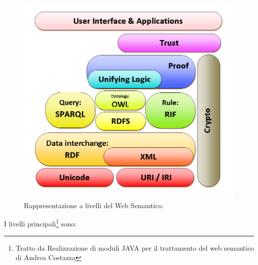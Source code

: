 \documentclass[a4paper,11pt]{article}
\begin{document}
\begin{figure}[ht]
	\centering
	\includegraphics[scale=0.5]{semweb-layers.png}
	\caption{Rappresentazione a livelli del Web Semantico.}
	\label{fig:1}
\end{figure}\newpage I livelli principali\footnote{Tratto da Realizzazione di moduli JAVA per il trattamento del web semantico di Andrea Costazza} sono:
\end{document}
